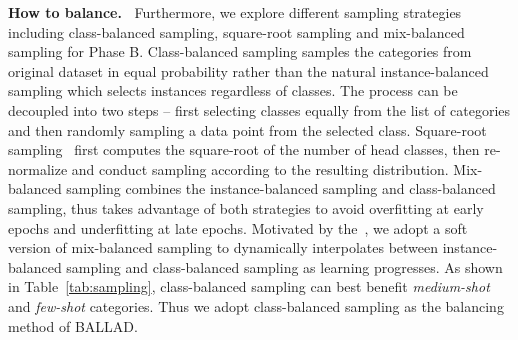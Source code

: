 \documentclass[10pt,twocolumn,letterpaper]{article}
\newcommand{\approach}{\textsc{BALLAD}}
\begin{document}
\begin{table}[t!]
    \centering
    \footnotesize
    \caption{Comparison of different balanced sampling strategies on ImageNet-LT.}
    \vspace*{-13pt}
    \label{tab:sampling}
\end{table}

\noindent\textbf{How to balance.~}
Furthermore, we explore different sampling strategies including class-balanced sampling, square-root sampling and mix-balanced sampling for Phase B.
Class-balanced sampling samples the categories from original dataset in equal probability rather than the natural instance-balanced sampling which selects instances regardless of classes. The process can be decoupled into two steps -- first selecting classes equally from the list of categories and then randomly sampling a data point from the selected class. Square-root sampling~\cite{mahajan2018exploring} first computes the square-root of the number of head classes, then re-normalize and conduct sampling according to the resulting distribution. Mix-balanced sampling combines the instance-balanced sampling and class-balanced sampling, thus takes advantage of both strategies to avoid overfitting at early epochs and underfitting at late epochs. Motivated by the~\cite{Kang2020Decoupling}, we adopt a soft version of mix-balanced sampling to dynamically interpolates between instance-balanced sampling and class-balanced sampling as learning progresses. As shown in Table~\ref{tab:sampling}, class-balanced sampling can best benefit \emph{medium-shot} and \emph{few-shot} categories. Thus we adopt class-balanced sampling as the balancing method of \approach{}.
\end{document}
